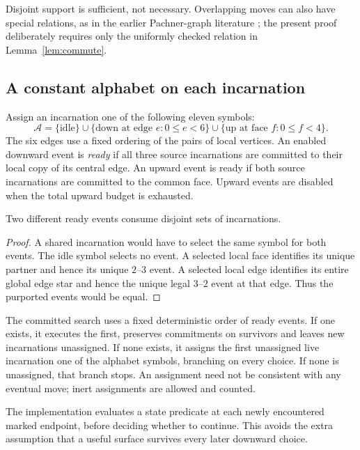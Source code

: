 Disjoint support is sufficient, not necessary. Overlapping moves can also
have special relations, as in the earlier Pachner-graph literature
\cite{BurtonPachner}; the present proof deliberately requires only the
uniformly checked relation in Lemma~\ref{lem:commute}.

\subsection{A constant alphabet on each incarnation}

Assign an incarnation one of the following eleven symbols:
\[
 \mathcal A=\{\text{idle}\}
 \cup\{\text{down at edge }e:0\le e<6\}
 \cup\{\text{up at face }f:0\le f<4\}.
\]
The six edges use a fixed ordering of the pairs of local vertices.
An enabled downward event is \emph{ready} if all three source incarnations
are committed to their local copy of its central edge. An upward event is
ready if both source incarnations are committed to the common face. Upward
events are disabled when the total upward budget is exhausted.

\begin{lemma}\label{lem:ready}
Two different ready events consume disjoint sets of incarnations.
\end{lemma}
\begin{proof}
A shared incarnation would have to select the same symbol for both events.
The idle symbol selects no event. A selected local face identifies its unique
partner and hence its unique $2$--$3$ event. A selected local edge identifies
its entire global edge star and hence the unique legal $3$--$2$ event at
that edge. Thus the purported events would be equal.
\end{proof}

The committed search uses a fixed deterministic order of ready events. If
one exists, it executes the first, preserves commitments on survivors and
leaves new incarnations unassigned. If none exists, it assigns the first
unassigned live incarnation one of the alphabet symbols, branching on every
choice. If none is unassigned, that branch stops. An assignment need not be
consistent with any eventual move; inert assignments are allowed and counted.

The implementation evaluates a state predicate at each newly encountered
marked endpoint, before deciding whether to continue. This avoids the extra
assumption that a useful surface survives every later downward choice.

